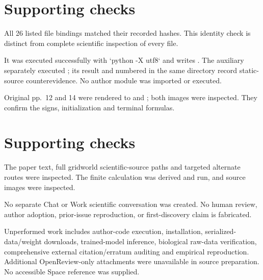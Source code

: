 \documentclass[10pt]{article}
\begin{document}
\section*{Supporting checks}
All 26 listed file bindings matched their recorded hashes. This identity check is distinct from complete scientific inspection of every file.\par
It was executed successfully with `python -X utf8` and writes . The auxiliary separately executed ; its result and numbered in the same directory record static-source counterevidence. No author module was imported or executed.\par
Original pp. 12 and 14 were rendered to and ; both images were inspected. They confirm the signs, initialization and terminal formulas.\par
\section*{Supporting checks}
The paper text, full gridworld scientific-source paths and targeted alternate routes were inspected. The finite calculation was derived and run, and source images were inspected.\par
No separate Chat or Work scientific conversation was created. No human review, author adoption, prior-issue reproduction, or first-discovery claim is fabricated.\par
Unperformed work includes author-code execution, installation, serialized-data/weight downloads, trained-model inference, biological raw-data verification, comprehensive external citation/erratum auditing and empirical reproduction. Additional OpenReview-only attachments were unavailable in source preparation. No accessible Space reference was supplied.\par
\end{document}
